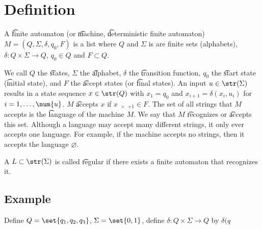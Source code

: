 
\section*{Definition}

A \t{finite automaton} (or \t{machine}, \t{deterministic finite automaton}) $M = (Q, \Sigma , \delta , q_0, F)$ is a list where $Q$ and $\Sigma $ is are finite sets (alphabets), $\delta : Q \times \Sigma  \to Q$, $q_0 \in Q$ and $F \subset Q$.

We call $Q$ the \t{states}, $\Sigma $ the \t{alphabet}, $\delta $ the \t{transition function}, $q_0$ the \t{start state} (\t{initial state}), and $F$ the \t{accept states} (or \t{final states}).
An input $u \in \str(\Sigma )$ results in a state sequence $x \in \str(Q)$ with $x_1 = q_0$ and $x_{i+1} = \delta (x_i, u_i)$ for $i = 1, \dots , \num{u}$.
$M$ \t{accepts} $x$ if $x_{\num{x}+1} \in F$.
The set of all strings that $M$ accepts is the \t{language} of the machine $M$.
We say that $M$ \t{recognizes} or \t{accepts} this set.
Although a language may accept many different strings, it only ever accepts one language.
For example, if the machine accepts no strings, then it accepts the language $\varnothing$.

A $L \subset \str(\Sigma )$ is called \t{regular} if there exists a finite automaton that recognizes it.

\subsection*{Example}

Define $Q = \set{q_1, q_2, q_3}$, $\Sigma  = \set{0, 1}$, define $\delta : Q \times \Sigma  \to Q$ by $\delta (q$

\blankpage